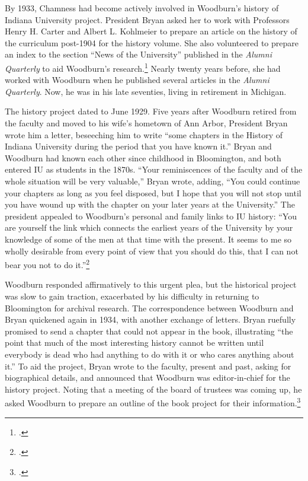 \documentclass[
  american,
  letterpaper,
]{scrreprt}
\begin{document}
By 1933, Chamness had become actively involved in Woodburn's history of
Indiana University project. President Bryan asked her to work with
Professors Henry H. Carter and Albert L. Kohlmeier to prepare an article
on the history of the curriculum post-1904 for the history volume. She
also volunteered to prepare an index to the section ``News of the
University'' published in the \emph{Alumni Quarterly} to aid Woodburn's
research.\footnote{.} Nearly twenty years before,
she had worked with Woodburn when he published several articles in the
\emph{Alumni Quarterly}. Now, he was in his late seventies, living in
retirement in Michigan.

The history project dated to June 1929. Five years after Woodburn
retired from the faculty and moved to his wife's hometown of Ann Arbor,
President Bryan wrote him a letter, beseeching him to write ``some
chapters in the History of Indiana University during the period that you
have known it.'' Bryan and Woodburn had known each other since childhood
in Bloomington, and both entered IU as students in the 1870s. ``Your
reminiscences of the faculty and of the whole situation will be very
valuable,'' Bryan wrote, adding, ``You could continue your chapters as
long as you feel disposed, but I hope that you will not stop until you
have wound up with the chapter on your later years at the University.''
The president appealed to Woodburn's personal and family links to IU
history: ``You are yourself the link which connects the earliest years
of the University by your knowledge of some of the men at that time with
the present. It seems to me so wholly desirable from every point of view
that you should do this, that I can not bear you not to do
it.''\footnote{.}

Woodburn responded affirmatively to this urgent plea, but the historical
project was slow to gain traction, exacerbated by his difficulty in
returning to Bloomington for archival research. The correspondence
between Woodburn and Bryan quickened again in 1934, with another
exchange of letters. Bryan ruefully promised to send a chapter that
could not appear in the book, illustrating ``the point that much of the
most interesting history cannot be written until everybody is dead who
had anything to do with it or who cares anything about it.'' To aid the
project, Bryan wrote to the faculty, present and past, asking for
biographical details, and announced that Woodburn was editor-in-chief
for the history project. Noting that a meeting of the board of trustees
was coming up, he asked Woodburn to prepare an outline of the book
project for their information.\footnote{.}
\end{document}
